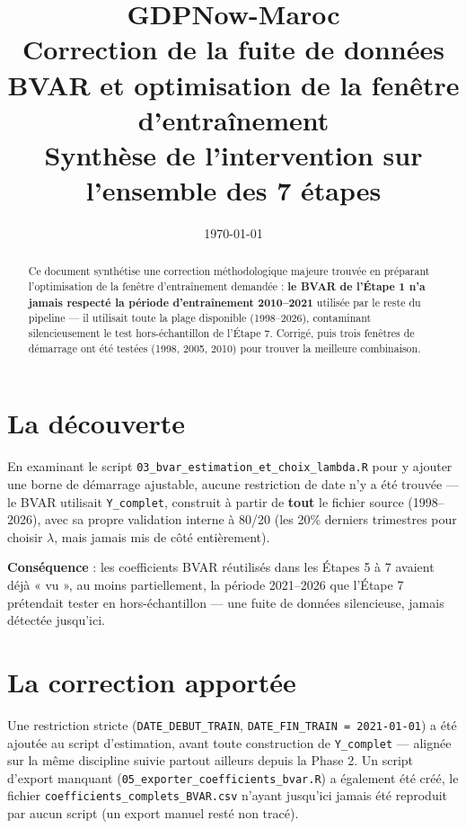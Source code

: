 \documentclass[11pt,a4paper]{article}
\title{\vspace{-1.3cm}\textcolor{bleuprincip}{\Huge\bfseries GDPNow-Maroc}\\[0.3cm]
\Large Correction de la fuite de données BVAR et optimisation de la fenêtre d'entraînement\\[0.15cm]
\normalsize\color{gray} Synthèse de l'intervention sur l'ensemble des 7 étapes}
\author{}
\date{\today}
\begin{document}
\maketitle
\thispagestyle{empty}

\begin{abstract}
\noindent Ce document synthétise une correction méthodologique majeure trouvée en préparant l'optimisation de la fenêtre d'entraînement demandée : \textbf{le BVAR de l'Étape 1 n'a jamais respecté la période d'entraînement 2010--2021} utilisée par le reste du pipeline --- il utilisait toute la plage disponible (1998--2026), contaminant silencieusement le test hors-échantillon de l'Étape 7. Corrigé, puis trois fenêtres de démarrage ont été testées (1998, 2005, 2010) pour trouver la meilleure combinaison.
\end{abstract}

\section{La découverte}

\begin{alertebox}
En examinant le script \texttt{03\_bvar\_estimation\_et\_choix\_lambda.R} pour y ajouter une borne de démarrage ajustable, aucune restriction de date n'y a été trouvée --- le BVAR utilisait \texttt{Y\_complet}, construit à partir de \textbf{tout} le fichier source (1998--2026), avec sa propre validation interne à 80/20 (les 20\% derniers trimestres pour choisir $\lambda$, mais jamais mis de côté entièrement).

\textbf{Conséquence} : les coefficients BVAR réutilisés dans les Étapes 5 à 7 avaient déjà « vu », au moins partiellement, la période 2021--2026 que l'Étape 7 prétendait tester en hors-échantillon --- une fuite de données silencieuse, jamais détectée jusqu'ici.
\end{alertebox}

\section{La correction apportée}

Une restriction stricte (\texttt{DATE\_DEBUT\_TRAIN}, \texttt{DATE\_FIN\_TRAIN = 2021-01-01}) a été ajoutée au script d'estimation, avant toute construction de \texttt{Y\_complet} --- alignée sur la même discipline suivie partout ailleurs depuis la Phase 2. Un script d'export manquant (\texttt{05\_exporter\_coefficients\_bvar.R}) a également été créé, le fichier \texttt{coefficients\_complets\_BVAR.csv} n'ayant jusqu'ici jamais été reproduit par aucun script (un export manuel resté non tracé).
\end{document}
